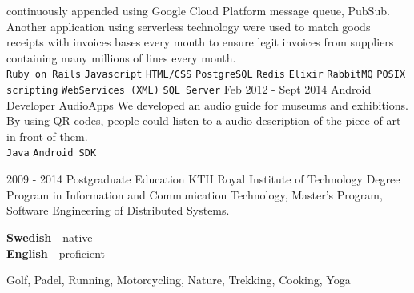 \documentclass[9pt]{template} %
\begin{document}
\begin{entrylist}
{      continuously appended using Google Cloud Platform message queue, PubSub.\\
      Another application using serverless technology were used to match goods
      receipts with invoices bases every month to ensure legit invoices from
      suppliers containing many millions of lines every month.\\
      \texttt{Ruby on Rails}\slashsep
      \texttt{Javascript}\slashsep
      \texttt{HTML/CSS}\slashsep
      \texttt{PostgreSQL}\slashsep
      \texttt{Redis}\slashsep
      \texttt{Elixir}\slashsep
      \texttt{RabbitMQ}\slashsep
      \texttt{POSIX scripting}\slashsep
      \texttt{WebServices (XML)}\slashsep
      \texttt{SQL Server}
    }
  \entry
    {Feb 2012 - Sept 2014}
    {Android Developer}
    {AudioApps}
    {We developed an audio guide for museums and exhibitions. By using QR codes,
      people could listen to a audio description of the piece of art in front
      of them.\\
      \texttt{Java}\slashsep
      \texttt{Android SDK}
    }
\end{entrylist}

\pagebreak



\begin{entrylist}
  \entry
    {2009 - 2014}
    {Postgraduate Education}
    {KTH Royal Institute of Technology}
    {Degree Program in Information and Communication Technology, Master's
      Program, Software Engineering of Distributed Systems.}
\end{entrylist}


\begin{minipage}[t]{0.3\textwidth}
  \vspace{-\baselineskip} %


  \textbf{Swedish} - native\\
  \textbf{English} - proficient
\end{minipage}
\hfill
\begin{minipage}[t]{0.7\textwidth}
  \vspace{-\baselineskip} %


  Golf, Padel, Running, Motorcycling, Nature, Trekking, Cooking, Yoga
\end{minipage}
\end{document}
